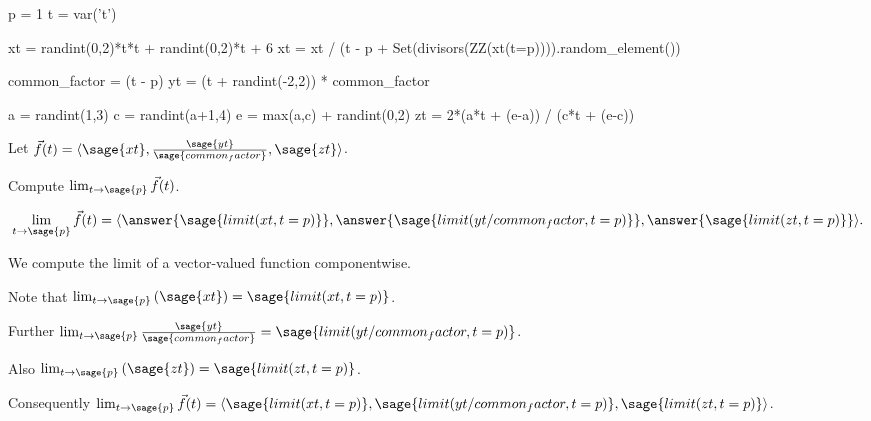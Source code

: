 \documentclass{ximera}
\author{Jim Fowler}
\begin{document}
\makerandom

\begin{sagesilent}
  p = 1
  t = var('t')
  
  xt = randint(0,2)*t*t + randint(0,2)*t + 6
  xt = xt / (t - p + Set(divisors(ZZ(xt(t=p)))).random_element())

  common_factor = (t - p)
  yt = (t + randint(-2,2)) * common_factor

  a = randint(1,3)
  c = randint(a+1,4)
  e = max(a,c) + randint(0,2)
  zt = 2*(a*t + (e-a)) / (c*t + (e-c))
\end{sagesilent}

\begin{exercise}

  Let $\vec{f}(t) = \langle \sage{xt}, \frac{\sage{yt}}{\sage{common_factor}}, \sage{zt} \rangle$.

  Compute $\lim_{t \to \sage{p}} \vec{f}(t)$.

  \begin{prompt}
    \[
      \lim_{t \to \sage{p}} \vec{f}(t) = \langle \answer{\sage{limit(xt,t=p)}}, \answer{\sage{limit(yt/common_factor,t=p)}}, \answer{\sage{limit(zt,t=p)}} \rangle.
    \]
  \end{prompt}
  
  \begin{hint}
    We compute the limit of a vector-valued function componentwise.
  \end{hint}

  \begin{hint}
    Note that $\lim_{t \to \sage{p}} \left( \sage{xt} \right) = \sage{limit(xt,t=p)}$.
  \end{hint}

  \begin{hint}
    Further $\lim_{t \to \sage{p}} \frac{\sage{yt}}{\sage{common_factor}} = \sage{limit(yt/common_factor,t=p)}$.
  \end{hint}

  \begin{hint}
    Also $\lim_{t \to \sage{p}} \left( \sage{zt} \right) = \sage{limit(zt,t=p)}$.
  \end{hint}
  
  \begin{hint}
    Consequently $\lim_{t \to \sage{p}} \vec{f}(t) = \langle \sage{limit(xt,t=p)}, \sage{limit(yt/common_factor,t=p)}, \sage{limit(zt,t=p)} \rangle$.
  \end{hint}          
  
\end{exercise}
\end{document}
